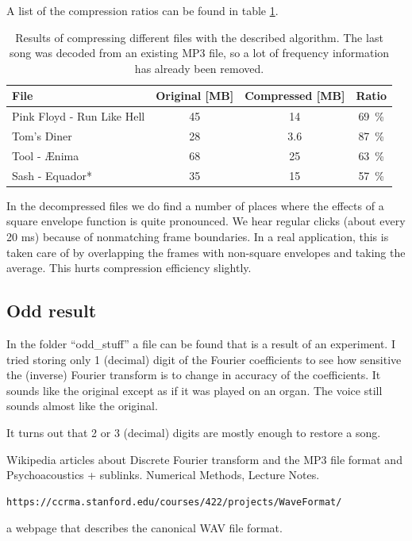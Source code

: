 \documentclass[a4paper,11pt]{article}
\begin{document}
A list of the compression ratios can be found in table \ref{compression}.

\begin{table}
\begin{center}
\begin{tabular}{lccc}
\toprule
File & Original [MB] & Compressed [MB] & Ratio \\
\midrule
Pink Floyd - Run Like Hell & 45 & 14 & 69\ \% \\
Tom's Diner & 28 & 3.6 & 87\ \% \\
Tool - Ænima & 68 & 25 & 63\ \% \\
Sash - Equador* & 35 & 15 & 57\ \% \\
\bottomrule
\end{tabular}
\end{center}
\caption{Results of compressing different files with the described algorithm.
The last song was decoded from an existing MP3 file, so a lot of frequency
information has already been removed.}
\label{compression}
\end{table}

In the decompressed files we do find a number of places where
the effects of a square envelope function is quite pronounced.
We hear regular clicks (about every 20 ms) because
of nonmatching frame boundaries. In a real application,
this is taken care of by overlapping the frames with non-square envelopes
and taking the average. This hurts compression efficiency slightly.

\subsection{Odd result}

In the folder ``odd\_stuff'' a file can be found that is a result of 
an experiment. I tried storing only 1 (decimal) digit of the Fourier
coefficients to see how sensitive the (inverse) Fourier transform
is to change in accuracy of the coefficients. It sounds like the original
except as if it was played on an organ. The voice still sounds almost like the
original.

It turns out that 2 or 3 (decimal) digits are mostly enough to restore
a song.

\begin{thebibliography}{2}
 Wikipedia articles about Discrete Fourier transform
and the MP3 file format and Psychoacoustics + sublinks.
 Numerical Methods, Lecture Notes.
\begin{verbatim}https://ccrma.stanford.edu/courses/422/projects/WaveFormat/\end{verbatim}
a webpage that describes the canonical WAV file format.
\end{thebibliography}
\end{document}
